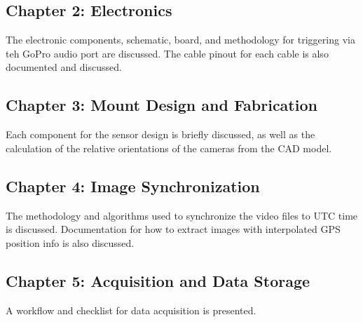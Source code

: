 	\subsection*{Chapter 2: Electronics}
	The electronic components, schematic, board, and methodology for triggering via teh GoPro audio port are discussed.  The cable pinout for each cable is also documented and discussed.
	\vspace{-.2em}
	\subsection*{Chapter 3: Mount Design and Fabrication}
	Each component for the sensor design is briefly discussed, as well as the calculation of the relative orientations of the cameras from the CAD model.  
	\vspace{-.2em}
	\subsection*{Chapter 4: Image Synchronization}
	The methodology and algorithms used to synchronize the video files to UTC time is discussed.  Documentation for how to extract images with interpolated GPS position info is also discussed.
	\vspace{-.2em}
	\subsection*{Chapter 5: Acquisition and Data Storage}
	A workflow and checklist for data acquisition is presented.

